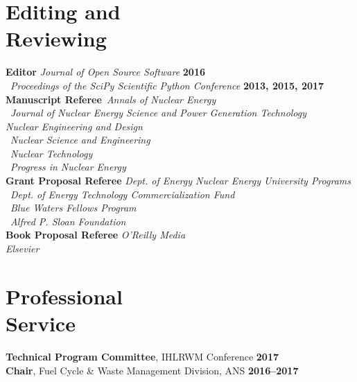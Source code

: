 \documentclass[margin,line]{resume}
\begin{document}
\begin{resume}
    \section{\mysidestyle Editing and\\Reviewing}
    \textbf{Editor} \hfill \emph{Journal of Open Source Software} \textbf{2016}\\%
                    \mbox{}~\hfill \emph{Proceedings of the SciPy Scientific 
                    Python Conference} \textbf{2013, 2015, 2017}\vspace{2mm}\\%
    \textbf{Manuscript Referee}~\hfill\emph{Annals of Nuclear Energy}\\%
                            \mbox{}~\hfill \emph{Journal of Nuclear Energy Science and Power Generation Technology} \\%
                            \mbox{}\hfill \emph{Nuclear Engineering and Design}\\%
                            \mbox{}~\hfill\emph{Nuclear Science and Engineering}\\%
                            \mbox{}~\hfill\emph{Nuclear Technology}\\%
                            \mbox{}~\hfill\emph{Progress in Nuclear Energy}\vspace{2mm}\\%
    \textbf{Grant Proposal Referee} \hfill \emph{Dept. of Energy Nuclear Energy University Programs}\\%
                            \mbox{}~\hfill\emph{Dept. of Energy Technology Commercialization Fund}\\%
                            \mbox{}~\hfill\emph{Blue Waters Fellows Program}\vspace{2mm}\\%
                            \mbox{}~\hfill\emph{Alfred P. Sloan Foundation}\vspace{2mm}\\%
    \textbf{Book Proposal Referee} \hfill\emph{O'Reilly Media}\\%
                            \mbox{}\hfill\emph{Elsevier}
    \section{\mysidestyle Professional\\Service}
		\textbf{Technical Program Committee}, IHLRWM Conference \hfill \textbf{2017}\vspace{.5mm}\\%
		\textbf{Chair}, Fuel Cycle \& Waste Management Division, ANS  
                \hfill \textbf{2016--2017}

\end{resume}
\end{document}
